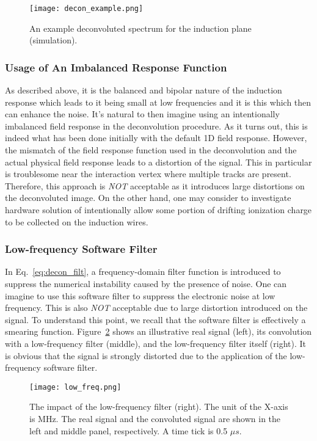 \begin{figure}[htb]
\centering
\texttt{[image: decon\_example.png]}
\caption{An example deconvoluted spectrum for the induction plane (simulation).}
\label{fig:decon_example}
\end{figure}

\subsubsection{Usage of An Imbalanced Response Function}

As described above, it is the balanced and bipolar nature of the
induction response which leads to it being small at low frequencies
and it is this which then can enhance the noise.
It's natural to then imagine using an intentionally imbalanced field
response in the deconvolution procedure.
As it turns out, this is indeed what has been done initially with the default 1D field response. 
However, the mismatch of the field response function
used in the deconvolution and the actual physical field response 
leads to a distortion of the signal. This in particular is troublesome
near the interaction vertex where multiple tracks are present. 
Therefore, this approach is {\it NOT} acceptable as it introduces large distortions
on the deconvoluted image. On the other hand, one may consider to investigate 
hardware solution of intentionally allow some portion of drifting ionization charge 
to be collected on the induction wires. 

\subsubsection{Low-frequency Software Filter}\label{sec:low_freq_filter}

In Eq.~\eqref{eq:decon_filt}, a frequency-domain  filter function is introduced 
to suppress the numerical instability caused by the presence of noise. One can imagine to use this
software filter to suppress the electronic noise at low frequency. This is also 
{\it NOT} acceptable due to large distortion introduced on the signal. To understand this 
point, we recall that the software filter is effectively a smearing function. Figure~\ref{fig:low_f_filter} shows an illustrative 
real signal (left), its convolution with a low-frequency filter (middle), and 
the low-frequency filter itself (right). It is obvious that the signal is strongly 
distorted due to the application of the low-frequency software filter. 

\begin{figure}[htb]
\centering
\texttt{[image: low\_freq.png]}
\caption{The impact of the low-frequency filter (right). The unit of the X-axis 
is MHz.  The real signal and the convoluted signal are shown in the left and
middle panel, respectively. A time tick is 0.5 $\mu s$.}
\label{fig:low_f_filter}
\end{figure}

